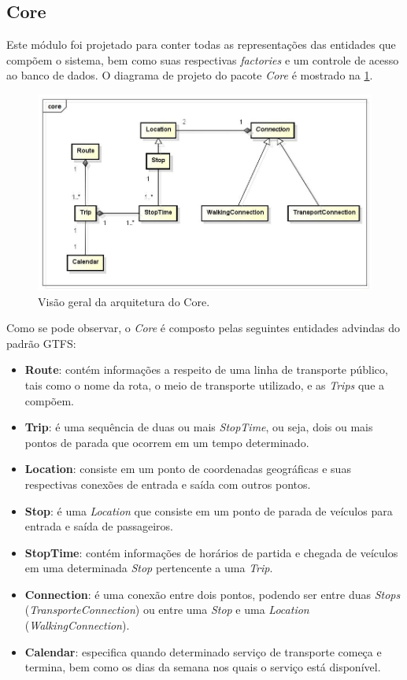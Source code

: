 \subsection{Core}
Este módulo foi projetado para conter todas as representações das entidades que compõem o sistema, bem como suas respectivas \emph{factories} e um controle de acesso ao banco de dados.
O diagrama de projeto do pacote \emph{Core} é mostrado na \ref{fig:core}.

\begin{figure}[!htb]
	\centering
	\includegraphics[width=1\textwidth]{./CoreDiagram.jpg}
	\caption[ImgCore]{Visão geral da arquitetura do Core.}
	\label{fig:core}
\end{figure}

Como se pode observar, o \emph{Core} é composto pelas seguintes entidades advindas do padrão GTFS:

\begin{itemize}
	\item \textbf{Route}: contém informações a respeito de uma linha de transporte público, tais como o nome da rota, o meio de transporte utilizado, e as \emph{Trips} que a compõem.
	\item \textbf{Trip}: é uma sequência de duas ou mais \emph{StopTime}, ou seja, dois ou mais pontos de parada que ocorrem em um tempo determinado.
	\item \textbf{Location}: consiste em um ponto de coordenadas geográficas e suas respectivas conexões de entrada e saída com outros pontos.
	\item \textbf{Stop}: é uma \emph{Location} que consiste em um ponto de parada  de veículos para entrada e saída de passageiros.
	\item \textbf{StopTime}: contém informações de horários de partida e chegada de veículos em uma determinada \emph{Stop} pertencente a uma \emph{Trip}.
	\item \textbf{Connection}: é uma conexão entre dois pontos, podendo ser entre duas \emph{Stops} (\emph{TransporteConnection}) ou entre uma \emph{Stop} e uma \emph{Location} (\emph{WalkingConnection}).
	\item \textbf{Calendar}: especifica quando determinado serviço de transporte começa e termina, bem como os dias da semana nos quais o serviço está disponível.
\end{itemize}

